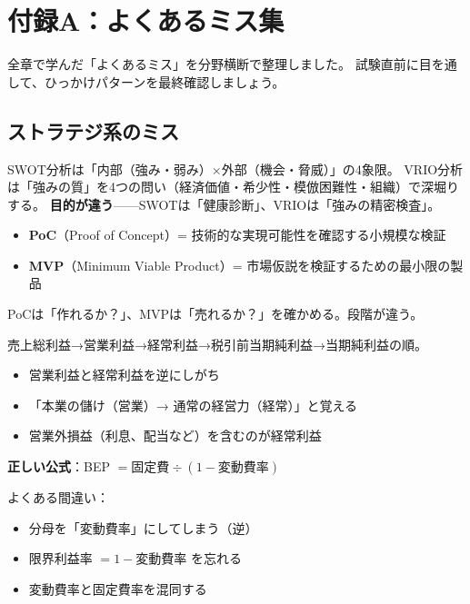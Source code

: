 \chapter*{付録A：よくあるミス集}

全章で学んだ「よくあるミス」を分野横断で整理しました。
試験直前に目を通して、ひっかけパターンを最終確認しましょう。

\section*{ストラテジ系のミス}

\begin{yokumiss}[SWOTとVRIOの混同]
SWOT分析は「内部（強み・弱み）×外部（機会・脅威）」の4象限。
VRIO分析は「強みの質」を4つの問い（経済価値・希少性・模倣困難性・組織）で深堀りする。
\textbf{目的が違う}——SWOTは「健康診断」、VRIOは「強みの精密検査」。
\end{yokumiss}

\begin{yokumiss}[PoCとMVPの混同]
\begin{itemize}
  \item \textbf{PoC}（Proof of Concept）= 技術的な実現可能性を確認する小規模な検証
  \item \textbf{MVP}（Minimum Viable Product）= 市場仮説を検証するための最小限の製品
\end{itemize}
PoCは「作れるか？」、MVPは「売れるか？」を確かめる。段階が違う。
\end{yokumiss}

\begin{yokumiss}
売上総利益→営業利益→経常利益→税引前当期純利益→当期純利益の順。
\begin{itemize}
  \item 営業利益と経常利益を逆にしがち
  \item 「本業の儲け（営業）→ 通常の経営力（経常）」と覚える
  \item 営業外損益（利息、配当など）を含むのが経常利益
\end{itemize}
\end{yokumiss}

\begin{yokumiss}[損益分岐点の公式ミス]
\textbf{正しい公式}：BEP $= \text{固定費} \div (1 - \text{変動費率})$

よくある間違い：
\begin{itemize}
  \item 分母を「変動費率」にしてしまう（逆）
  \item 限界利益率 $= 1 - \text{変動費率}$ を忘れる
  \item 変動費率と固定費率を混同する
\end{itemize}
\end{yokumiss}

